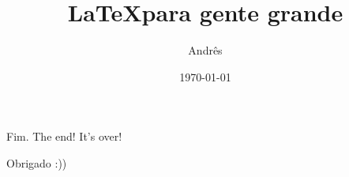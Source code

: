 \documentclass{beamer}
\title{\LaTeX para gente grande}
\author{Andrês}
\date{\today}
\begin{document}
\begin{frame}
    \maketitle
\end{frame}

\begin{frame}{Fim. The end! It's over!}
    \begin{center}
        \Huge Obrigado :))
    \end{center}
\end{frame}
\end{document}
